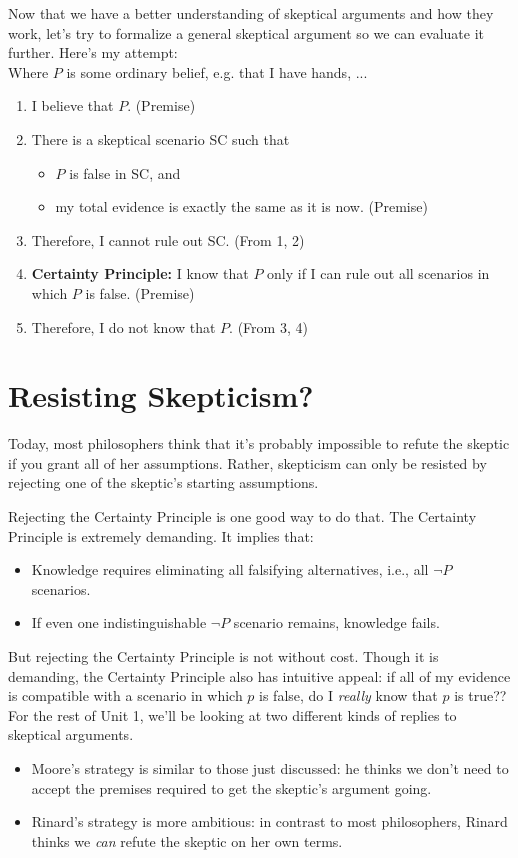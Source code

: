 \documentclass[english, a4paper]{article}
\begin{document}
Now that we have a better understanding of skeptical arguments and how they work, let's try to formalize a general skeptical argument so we can evaluate it further. Here's my attempt:\\

Where $P$ is some ordinary belief, e.g. that I have hands, ...

\begin{enumerate}[label={(\arabic*)}]
	\item I believe that $P$. (Premise)
	\item There is a skeptical scenario SC such that
	\begin{itemize}
		\item $P$ is false in SC, and
		\item my total evidence is exactly the same as it is now. (Premise)
	\end{itemize}
	\item Therefore, I cannot rule out SC. (From 1, 2)
	\item \textbf{Certainty Principle:} I know that $P$ only if I can rule out all scenarios in which $P$ is false. (Premise)
	\item Therefore, I do not know that $P$. (From 3, 4)
\end{enumerate}

\section{Resisting Skepticism?}

Today, most philosophers think that it's probably impossible to refute the skeptic if you grant all of her assumptions. Rather, skepticism can only be resisted by rejecting one of the skeptic's starting assumptions.

Rejecting the Certainty Principle is one good way to do that. The Certainty Principle is extremely demanding. It implies that:
\begin{itemize}
	\item Knowledge requires eliminating all falsifying alternatives, i.e., all $\neg P$ scenarios.
	\item If even one indistinguishable $\neg P$ scenario remains, knowledge fails.
\end{itemize}

But rejecting the Certainty Principle is not without cost. Though it is demanding, the Certainty Principle also has intuitive appeal: if all of my evidence is compatible with a scenario in which $p$ is false, do I \textit{really} know that $p$ is true??\\

For the rest of Unit 1, we'll be looking at two different kinds of replies to skeptical arguments.

\begin{itemize}
	\item Moore's strategy is similar to those just discussed: he thinks we don't need to accept the premises required to get the skeptic's argument going.
	\item Rinard's strategy is more ambitious: in contrast to most philosophers, Rinard thinks we \textit{can} refute the skeptic on her own terms. 
\end{itemize}
\end{document}
